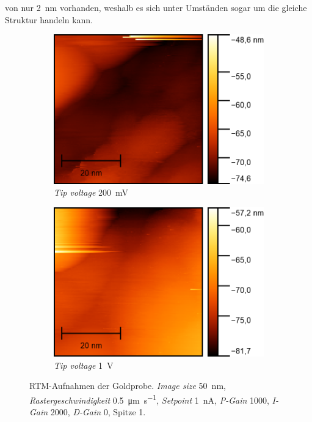 von nur \SI{2}{\nano \meter} vorhanden, weshalb es sich unter Umständen sogar um die gleiche Struktur handeln kann.
\begin{figure}[H]
    \centering
    \begin{subfigure}{0.45\textwidth}
        \centering
        \includegraphics[width=\linewidth]{../figs/Gold10476}
        \caption{\textit{Tip voltage} \SI{200}{\milli \volt}}
    \end{subfigure}
    \begin{subfigure}{0.45\textwidth}
        \centering
        \includegraphics[width=\linewidth]{../figs/Gold10479}
        \caption{\textit{Tip voltage} \SI{1}{\volt}}
    \end{subfigure}
    \caption{RTM-Aufnahmen der Goldprobe. \textit{Image size} \SI{50}{\nano \meter}, \textit{Rastergeschwindigkeit} \SI{0,5}{\micro\meter \per \second}, \textit{Setpoint} \SI{1}{\nano \ampere},
    \textit{P-Gain} \num{1000}, \textit{I-Gain} \num{2000}, \textit{D-Gain} \num{0}, Spitze 1.}\label{fig:gold4}
\end{figure}
